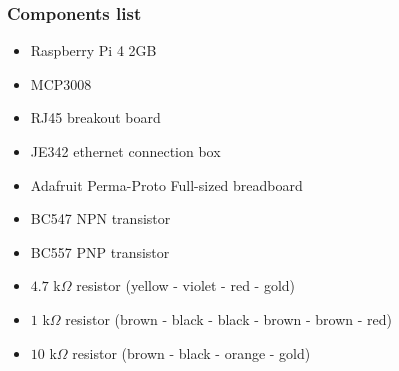 
\subsubsection{Components list}
	\begin{itemize}
        \item Raspberry Pi 4 2GB
        \item MCP3008
        \item RJ45 breakout board
        \item JE342 ethernet connection box
        \item Adafruit Perma-Proto Full-sized breadboard
		\item BC547 NPN transistor
		\item BC557 PNP transistor
		\item $4.7$ k$\Omega$ resistor (yellow - violet - red - gold)
		\item $1$ k$\Omega$ resistor (brown - black - black - brown - brown - red)
		\item $10$ k$\Omega$ resistor (brown - black - orange - gold)
	\end{itemize}


